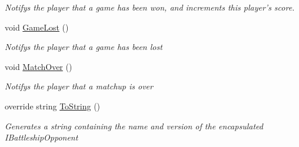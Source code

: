 \begin{DoxyCompactItemize}
\begin{DoxyCompactList}\small\item\em Notifys the player that a game has been won, and increments this player's score.\end{DoxyCompactList}\item 
\hypertarget{class_m_b_c_1_1_core_1_1_controller_afe80359151442aaa5c45dc517bd3e8b2}{void \hyperlink{class_m_b_c_1_1_core_1_1_controller_afe80359151442aaa5c45dc517bd3e8b2}{Game\-Lost} ()}\label{class_m_b_c_1_1_core_1_1_controller_afe80359151442aaa5c45dc517bd3e8b2}

\begin{DoxyCompactList}\small\item\em Notifys the player that a game has been lost\end{DoxyCompactList}\item 
\hypertarget{class_m_b_c_1_1_core_1_1_controller_a1beaca8b029cff045923c06b24114653}{void \hyperlink{class_m_b_c_1_1_core_1_1_controller_a1beaca8b029cff045923c06b24114653}{Match\-Over} ()}\label{class_m_b_c_1_1_core_1_1_controller_a1beaca8b029cff045923c06b24114653}

\begin{DoxyCompactList}\small\item\em Notifys the player that a matchup is over\end{DoxyCompactList}\item 
\hypertarget{class_m_b_c_1_1_core_1_1_controller_a75fb8c7721eafa5a0d041d15218fcef6}{override string \hyperlink{class_m_b_c_1_1_core_1_1_controller_a75fb8c7721eafa5a0d041d15218fcef6}{To\-String} ()}\label{class_m_b_c_1_1_core_1_1_controller_a75fb8c7721eafa5a0d041d15218fcef6}

\begin{DoxyCompactList}\small\item\em Generates a string containing the name and version of the encapsulated I\-Battleship\-Opponent\end{DoxyCompactList}\end{DoxyCompactItemize}
